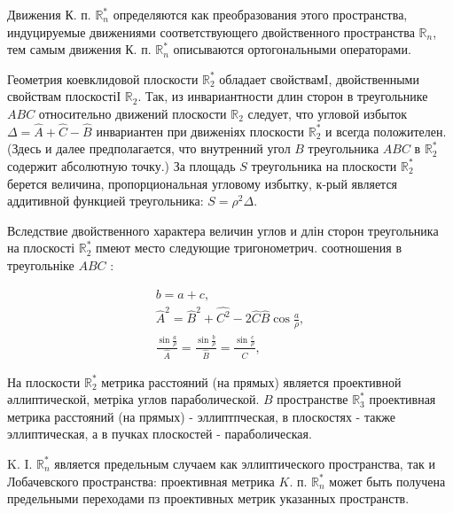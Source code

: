 \documentclass[10pt]{article}
\begin{document}
Движения К. п. $\mathbb{R}_{n}^{*}$ определяются как преобразования этого пространства, индуцируемые движениями соответствующего двойственного пространства $\mathbb{R}_{n}$, тем самым движения К. п. $\mathbb{R}_{n}^{*}$ описываются ортогональными операторами.



Геометрия коевклидовой плоскости $\mathbb{R}_{2}^{*}$ обладает свойствамІ, двойственными свойствам плоскостіІ $\mathbb{R}_{2}$. Так, из инвариантности длин сторон в треугольнике $A B C$ относительно движений плоскости $\mathbb{R}_{2}$ следует, что угловой избыток $\Delta=\widehat{A}+\widehat{C}-\widehat{B}$ инвариантен при движеніях плоскости $\mathbb{R}_{2}^{*}$ и всегда положителен. (Здесь и далее предполагается, что внутренний угол $B$ треугольника $A B C$ в $\mathbb{R}_{2}^{*}$ содержит абсолютную точку.) За площадь $S$ треугольника на плоскости $\mathbb{R}_{2}^{*}$ берется величина, пропорциональная угловому избытку, к-рый является аддитивной функцией треугольника: $S=\rho^{2} \Delta$.



Вследствие двойственного характера величин углов и длін сторон треугольника на плоскості $\mathbb{R}_{2}^{*}$ пмеют место следующие тригонометрич. соотношения в треугольніке $A B C$ :



\[

\begin{gathered}

b=a+c, \\

\hat{A}^{2}=\hat{B}^{2}+\widehat{C^{2}}-2 \widehat{C} \hat{B} \cos \frac{a}{\rho}, \\

\frac{\sin \frac{a}{\rho}}{\widehat{A}}=\frac{\sin \frac{b}{\rho}}{\widehat{B}}=\frac{\sin \frac{c}{\rho}}{\widehat{C}},

\end{gathered}

\]



На плоскости $\mathbb{R}_{2}^{*}$ метрика расстояний (на прямых) является проективной әллиптической, метріка углов параболической. $B$ пространстве $\mathbb{R}_{3}^{*}$ проективная метрика расстояний (на прямых) - эллиптпческая, в плоскостях - также эллиптическая, а в пучках плоскостей - параболическая.



K. I. $\mathbb{R}_{n}^{*}$ является предельным случаем как эллиптического пространства, так и Лобачевского пространства: проективная метрика $K$. п. $\mathbb{R}_{n}^{*}$ может быть получена предельными переходами пз проективных метрик указанных пространств.
\end{document}
